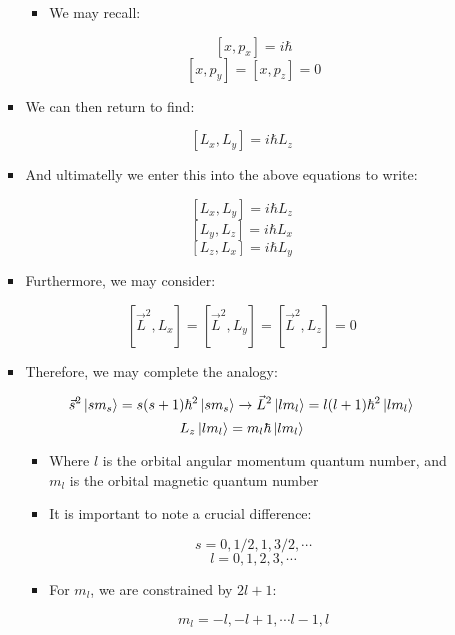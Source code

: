 \begin{itemize}
\begin{itemize}
\begin{itemize}
            \begin{itemize}

              \item We may recall:

                $$[x,p_x]=i\hbar$$
                $$[x,p_y]=[x,p_z]=0$$

            \end{itemize}

          \item We can then return to find:

            $$[L_x,L_y]=i\hbar L_z$$

          \item And ultimatelly we enter this into the above equations to write:

            $$[L_x,L_y]=i\hbar L_z$$
            $$[L_y,L_z]=i\hbar L_x$$
            $$[L_z,L_x]=i\hbar L_y$$

          \item Furthermore, we may consider:

            $$[\vec{L}^2,L_x]=[\vec{L}^2,L_y]=[\vec{L}^2,L_z]=0$$

          \item Therefore, we may complete the analogy:

            $$\vec{s}^2\ket{sm_s}=s(s+1)\hbar^2\ket{sm_s}\to\vec{L}^2\ket{lm_l}=l(l+1)\hbar^2\ket{lm_l}$$
            $$L_z\ket{lm_l}=m_l\hbar\ket{lm_l}$$

            \begin{itemize}

              \item Where $l$ is the orbital angular momentum quantum number, and $m_l$ is the orbital magnetic quantum number

              \item It is important to note a crucial difference:

                $$s=0,1/2,1,3/2,\cdots$$
                $$l=0,1,2,3,\cdots$$
            
              \item For $m_l$, we are constrained by $2l+1$:

                $$m_l=-l,-l+1,\cdots l-1, l$$

            \end{itemize}

        \end{itemize}

    \end{itemize}

\end{itemize}



